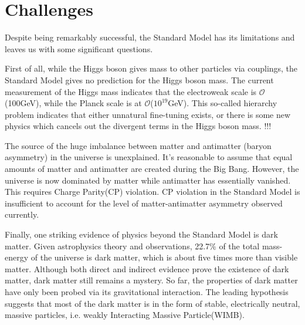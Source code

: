 \section{Challenges}
\par Despite being remarkably successful, the Standard Model has its limitations and leaves us with some significant questions.

\par First of all, while the Higgs boson gives mass to other particles via couplings, the Standard Model gives no prediction for
the Higgs boson mass. The current measurement of the Higgs mass indicates that the electroweak scale is $\mathcal{O}$(100GeV), 
while the Planck scale is at $\mathcal{O}$($10^{19}$GeV). This so-called hierarchy problem indicates that either unnatural fine-tuning exists, or there 
is some new physics which cancels out the divergent terms in the Higgs boson mass.
!!!



\par The source of the huge imbalance between matter and antimatter (baryon asymmetry) in the universe is unexplained. 
It's reasonable to assume that equal amounts of matter and antimatter are created during the Big Bang. However, 
the universe is now dominated by matter while antimatter has essentially vanished. This requires Charge Parity(CP) violation.
CP violation in the Standard Model is insufficient to account for the level of matter-antimatter asymmetry observed currently.

\par Finally, one striking evidence of physics beyond the Standard Model is dark matter. Given astrophysics theory and observations, 
22.7\% of the total mass-energy of the universe is dark matter, which is about five times more than visible matter. 
Although both direct and indirect evidence prove the existence of dark matter, dark matter still remains a mystery. 
So far, the properties of dark matter have only been probed via its gravitational interaction. The leading hypothesis suggests that 
most of the dark matter is in the form of stable, electrically neutral, massive particles, i.e. weakly Interacting Massive Particle(WIMB).


